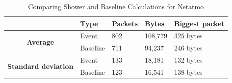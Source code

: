 \begin{table}[H]
    \centering
    \caption{Comparing Shower and Baseline Calculations for Netatmo}
    \begin{tabular}{c|l|l|l|l|}
        \cline{2-5}
        \multicolumn{1}{l|}{}                                              & \textbf{Type} & \textbf{Packets} & \textbf{Bytes} & \textbf{Biggest packet} \\ \hline
        \multicolumn{1}{|c|}{\multirow{2}{*}{\textbf{Average}}}            & Event         & 802              & 108,779        & 325 bytes               \\ \cline{2-5} 
        \multicolumn{1}{|c|}{}                                             & Baseline      & 711              & 94,237         & 246 bytes                \\ \hline
        \multicolumn{1}{|c|}{\multirow{2}{*}{\textbf{Standard deviation}}} & Event         & 133              & 18,181         & 132 bytes                 \\ \cline{2-5} 
        \multicolumn{1}{|c|}{}                                             & Baseline      & 123              & 16,541         & 138 bytes               \\ \hline          
    \end{tabular}
    \label{tab:NetatmoComparingBaselineAndShowerCalculations}
\end{table}

